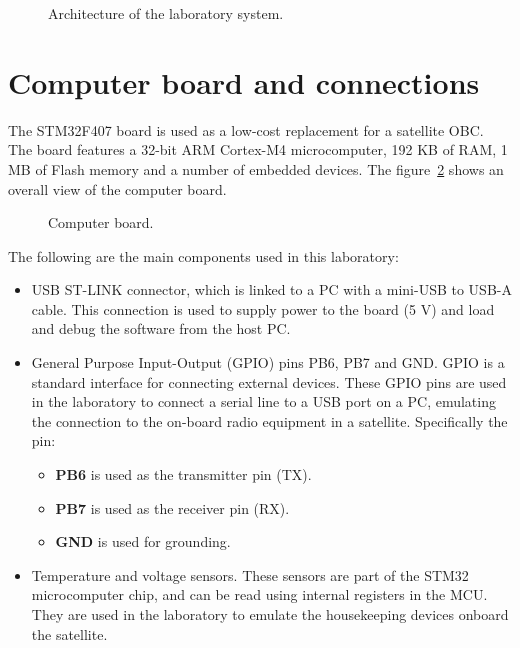 \begin{figure}[hbtp!]
            \caption{Architecture of the laboratory system.}
            \label{fig:architecture}
\end{figure}

\section*{Computer board and connections}

The STM32F407 board is used as a low-cost replacement for a satellite OBC.
The board features a 32-bit ARM Cortex-M4 microcomputer,
192 KB of RAM, 1 MB of Flash memory and a number of embedded devices.
The figure~\ref{fig:board}
shows an overall view of the computer board.

\begin{figure}[h]
    \caption{Computer board.}
    \label{fig:board}
\end{figure}

The following are the main components used in this laboratory:
\begin{itemize}
\item	USB ST-LINK connector, which is linked to a PC with a mini-USB to USB-A cable. This connection is used to supply power to the board (5 V) and load and debug the software from the host PC.

\item	General Purpose Input-Output (GPIO) pins PB6, PB7 and GND.
GPIO is a standard interface for connecting external devices.
These GPIO pins are used in the laboratory
to connect a serial line to a USB port on a PC,
emulating the connection to the on-board radio equipment in a satellite.
Specifically the pin:
\begin{itemize}
	\item \textbf{PB6} is used as the transmitter pin (TX).
	\item \textbf{PB7} is used as the receiver pin (RX).
	\item \textbf{GND} is used for grounding.
\end{itemize}

\item	Temperature and voltage sensors. These sensors are part of the STM32 microcomputer chip,
and can be read using internal registers in the MCU.
They are used in the laboratory to emulate the housekeeping devices onboard the satellite.
\end{itemize}
